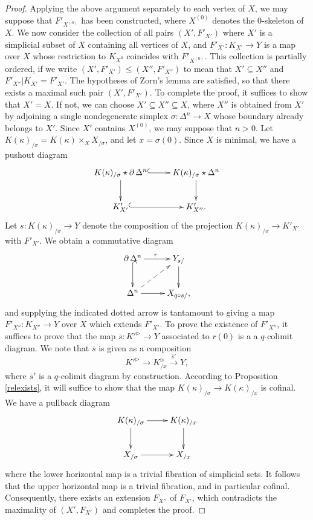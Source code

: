\begin{proof}
Applying the above argument separately to each vertex of $X$, we may suppose that
$F'_{X^{(0)}}$ has been constructed, where $X^{(0)}$ denotes the $0$-skeleton of $X$. We now consider the collection of all pairs $( X', F'_{X'})$ where $X'$ is a simplicial subset of $X$ containing all vertices of $X$, and $F'_{X'}: K_{X'} \rightarrow Y$ is a map over $X$ whose restriction to
$K_{X^{0}}$ coincides with $F'_{X^{(0)}}$. This collection is partially ordered, if we write
$(X', F'_{X'}) \leq (X'', F'_{X''})$ to mean that $X'\subseteq X''$ and $F'_{X''} | K_{X'} = F'_{X'}$. 
The hypotheses of Zorn's lemma are satisfied, so that there exists a maximal such pair
$(X', F'_{X'})$. To complete the proof, it suffices to show that $X' = X$. If not, we can choose
$X' \subseteq X'' \subseteq X$, where $X''$ is obtained from $X'$ by adjoining a single nondegenerate simplex $\sigma: \Delta^n \rightarrow X$ whose boundary already belongs to $X'$.
Since $X'$ contains $X^{(0)}$, we may suppose that $n > 0$. Let $K(\kappa)_{/\sigma} = K(\kappa) \times_{X} X_{/\sigma}$, and let
$x = \sigma(0)$. Since $X$ is minimal, we have a pushout diagram
$$ \xymatrix{ K(\kappa)_{/\sigma} \star \bd \Delta^n \ar@{^{(}->}[r] \ar[d] & K(\kappa)_{/\sigma} \star \Delta^n \ar[d] \\
K'_{X'} \ar@{^{(}->}[r] & K'_{X''}. }$$
Let $s: K(\kappa)_{/\sigma} \rightarrow Y$ denote the composition of the projection $K(\kappa)_{/\sigma} \rightarrow K'_{X'}$ with
$F'_{X'}$.  We obtain a commutative diagram
$$ \xymatrix{ \bd \Delta^n \ar[r]^{r} \ar@{^{(}->}[d] & Y_{s/} \ar[d] \\
\Delta^n \ar[r] \ar@{-->}[ur] & X_{q \circ s/}, }$$
and supplying the indicated dotted arrow is tantamount to giving a map $F'_{X''}: K_{X''} \rightarrow Y$ over $X$ which extends $F'_{X'}$. To prove the existence of $F'_{X''}$, it suffices to prove
that the map $\overline{s}: {K'}^{\triangleright} \rightarrow Y$ associated to $r(0)$ is a 
a $q$-colimit diagram. We note that $\overline{s}$ is given as a composition
$$ {K'}^{\triangleright} \rightarrow K_{/x}^{\triangleright} \stackrel{\overline{s}'}{\rightarrow} Y,$$
where $\overline{s}'$ is a $q$-colimit diagram by construction. According to Proposition \ref{relexists}, it will suffice to show that the map $K(\kappa)_{/\sigma} \rightarrow K(\kappa)_{/x}$ is cofinal.
We have a pullback diagram
$$ \xymatrix{ K(\kappa)_{/\sigma} \ar[r] \ar[d] & K(\kappa)_{/x} \ar[d] \\
X_{/\sigma} \ar[r] & X_{/x} }$$ where the lower horizontal map is a trivial fibration of simplicial sets.
It follows that the upper horizontal map is a trivial fibration, and in particular cofinal. Consequently, there exists an extension $F_{X''}$ of $F_{X'}$, which contradicts the maximality of $(X', F_{X'})$ and completes the proof.
\end{proof}

